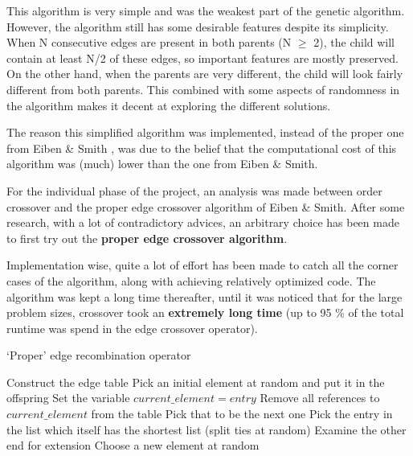 \documentclass[a4paper,10pt]{article}
\begin{document}
This algorithm is very simple and was the weakest part of the genetic algorithm. However, the algorithm still has some desirable features despite its simplicity. When N consecutive edges are present in both parents (N $ \ge $ 2), the child will contain at least N/2 of these edges, so important features are mostly preserved. On the other hand,
when the parents are very different, the child will look fairly different from both parents. This combined with some aspects of randomness in the algorithm makes it decent at exploring the different solutions. 

The reason this simplified algorithm was implemented, instead of the proper one from Eiben \& Smith \cite{eiben_smith}, was due to the belief that the computational cost of this algorithm was (much) lower than the one from Eiben \& Smith. 

For the individual phase of the project, an analysis was made between order crossover and the proper edge crossover algorithm of Eiben \& Smith. After some research, with a lot of contradictory advices, an arbitrary choice has been made to first try out the \textbf{proper edge crossover algorithm}.

Implementation wise, quite a lot of effort has been made to catch all the corner cases of the algorithm, along with achieving relatively optimized code. The algorithm was kept a long time thereafter, until it was noticed that for the large problem sizes, crossover took an \textbf{extremely long time} (up to 95 \% of the total runtime was spend in the edge crossover operator).

\begin{algorithm}
\caption{`Proper' edge recombination operator \cite{eiben_smith}}\label{proper_edge_crossover}
\begin{algorithmic}
\State Construct the edge table
\State Pick an initial element at random and put it in the offspring
\State Set the variable $current\_element = entry$
\State Remove all references to $current\_element$ from the table
\State Pick that to be the next one
\Else
\State Pick the entry in the list which itself has the shortest list (split ties at random)
\EndIf
{}
\State Examine the other end for extension
\Else
\State Choose a new element at random
\EndIf
\EndIf
\EndWhile
\end{algorithmic}
\end{algorithm}
\end{document}
